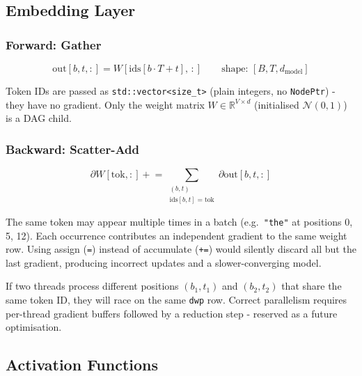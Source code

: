 \documentclass[12pt, a4paper]{article}
\begin{document}
\subsection{Embedding Layer}

\subsubsection{Forward: Gather}

\[
  \text{out}[b, t, :] = W[\text{ids}[b \cdot T + t],\, :]
  \qquad \text{shape: } [B, T, d_{\text{model}}]
\]

Token IDs are passed as \texttt{std::vector\textless size\_t\textgreater}
(plain integers, no \texttt{NodePtr}) - they have no gradient.  Only the
weight matrix $W \in \mathbb{R}^{V \times d}$ (initialised $\mathcal{N}(0,1)$)
is a DAG child.

\subsubsection{Backward: Scatter-Add}

\[
  \partial W[\text{tok}, :] \mathrel{+}=
    \sum_{\substack{(b,t) \\ \text{ids}[b,t]=\text{tok}}} \partial \text{out}[b, t, :]
\]

\begin{tcolorbox}[interviewbox, title={Interview: Why scatter-add and not scatter-assign?}]
  The same token may appear multiple times in a batch (e.g.\ \texttt{"the"}
  at positions 0, 5, 12).  Each occurrence contributes an independent gradient
  to the same weight row.  Using assign (\texttt{=}) instead of accumulate
  (\texttt{+=}) would silently discard all but the last gradient, producing
  incorrect updates and a slower-converging model.
\end{tcolorbox}

\begin{tcolorbox}[interviewbox, title={Interview: Why is the scatter-add loop NOT parallelised with OpenMP?}]
  If two threads process different positions \((b_1, t_1)\) and \((b_2, t_2)\)
  that share the same token ID, they will race on the same \texttt{dwp} row.
  Correct parallelism requires per-thread gradient buffers followed by a
  reduction step - reserved as a future optimisation.
\end{tcolorbox}

\subsection{Activation Functions}
\end{document}
